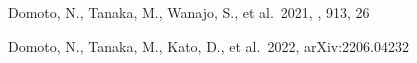 \documentclass[twocolumn, twocolappendix]{aastex63}
\begin{document}
\begin{thebibliography}{}






 Domoto, N., Tanaka, M., Wanajo, S., et al.\ 2021, \apj, 913, 26


 Domoto, N., Tanaka, M., Kato, D., et al.\ 2022, arXiv:2206.04232

























\end{thebibliography}
\end{document}
